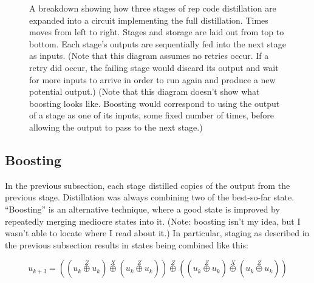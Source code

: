 \documentclass[onecolumn,unpublished,a4paper]{quantumarticle}
\theoremstyle{definition}
\theoremstyle{definition}
\theoremstyle{definition}
\begin{document}
\begin{figure}
    \centering
    \caption{
        A breakdown showing how three stages of rep code distillation are expanded into a circuit implementing the full distillation.
        Times moves from left to right.
        Stages and storage are laid out from top to bottom.
        Each stage's outputs are sequentially fed into the next stage as inputs.
        (Note that this diagram assumes no retries occur. If a retry did occur, the failing stage would discard its output and wait for more inputs to arrive in order to run again and produce a new potential output.)
        (Note that this diagram doesn't show what boosting looks like.
        Boosting would correspond to using the output of a stage as one of its inputs, some fixed number of times, before allowing the output to pass to the next stage.)
    }
    \label{fig:staging}
\end{figure}

\subsection{Boosting}

In the previous subsection, each stage distilled copies of the output from the previous stage.
Distillation was always combining two of the best-so-far state.
``Boosting'' is an alternative technique, where a good state is improved by repeatedly merging mediocre states into it.
(Note: boosting isn't my idea, but I wasn't able to locate where I read about it.)
In particular, staging as described in the previous subsection results in states being combined like this:

\begin{equation}
u_{k+3} = \left(\left(u_k \stackrel{Z}\oplus u_k\right) \stackrel{X}\oplus \left(u_k \stackrel{Z}\oplus u_k\right)\right) 
\stackrel{Z}\oplus
\left(\left(u_k \stackrel{Z}\oplus u_k\right) \stackrel{X}\oplus \left(u_k \stackrel{Z}\oplus u_k\right)\right)
\end{equation}
\end{document}
